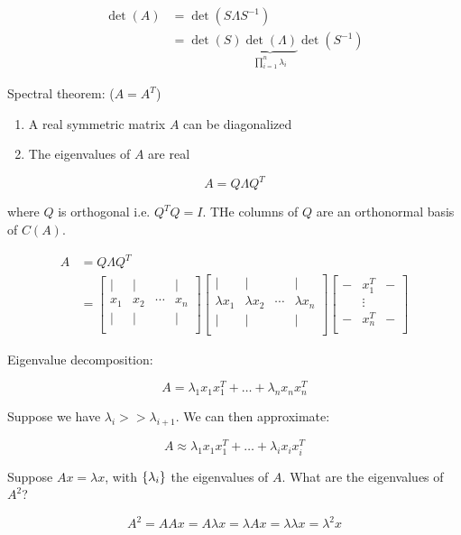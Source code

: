 \begin{align*}
  \det(A) &= \det(S \Lambda S^{-1})\\
  &= \det(S)
    \underbrace{
      \det(\Lambda)
    }_{\prod_{i=1}^n \lambda_i}
    \det(S^{-1})
\end{align*}

Spectral theorem: ($A = A^T$)
\begin{enumerate}
  \item A real symmetric matrix $A$ can be diagonalized
  \item The eigenvalues of $A$ are real
\end{enumerate}

\[
  A = Q \Lambda Q^T
\]

where $Q$ is orthogonal i.e. $Q^T Q = I$. THe columns of $Q$ are an orthonormal basis of $C(A)$.

\begin{align*}
  A &= Q \Lambda Q^T \\
  &=
  \begin{bmatrix}
    | & | &  & | \\
    x_1 & x_2 & \cdots & x_n \\
    | & | &  & | \\
  \end{bmatrix} 
    \begin{bmatrix}
    | & | &  & | \\
    \lambda x_1 & \lambda x_2 & \cdots & \lambda x_n \\
    | & | &  & | \\
  \end{bmatrix}
    \begin{bmatrix}
    - & x_1^T  & - \\
     & \vdots &  \\
    - & x_n^T & - \\
  \end{bmatrix} 
\end{align*}

Eigenvalue decomposition:

\[
  A = \lambda_1 x_1 x_1^T + \dots + \lambda_n x_n x_n^T
\]

Suppose we have $\lambda_i >> \lambda_{i+1}$. We can then approximate:

\[
  A \approx \lambda_1 x_1 x_1^T + \dots + \lambda_i x_i x_i^T
\]

Suppose $Ax = \lambda x$, with $\{\lambda_i\}$ the eigenvalues of $A$. What are the eigenvalues of $A^2$?

\[
  A^2 = A A x = A \lambda x = \lambda A x = \lambda \lambda x = \lambda^2 x
\]

